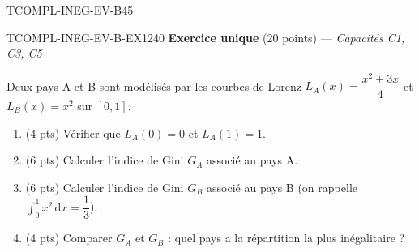 

\begin{evaluation}{TCOMPL-INEG-EV-B}{45}

\begin{exercice}{TCOMPL-INEG-EV-B-EX1}{2}{40}
\textbf{Exercice unique} (20 points) --- \textit{Capacités C1, C3, C5}

\medskip

Deux pays A et B sont modélisés par les courbes de Lorenz $L_A(x) = \dfrac{x^2+3x}{4}$ et $L_B(x) = x^2$ sur $[0,1]$.
\begin{enumerate}
  \item (4 pts) Vérifier que $L_A(0)=0$ et $L_A(1)=1$.
  \item (6 pts) Calculer l'indice de Gini $G_A$ associé au pays A.
  \item (6 pts) Calculer l'indice de Gini $G_B$ associé au pays B (on rappelle $\displaystyle\int_0^1 x^2\,\mathrm{d}x=\dfrac{1}{3}$).
  \item (4 pts) Comparer $G_A$ et $G_B$ : quel pays a la répartition la plus inégalitaire ?
\end{enumerate}
\end{exercice}

\end{evaluation}
